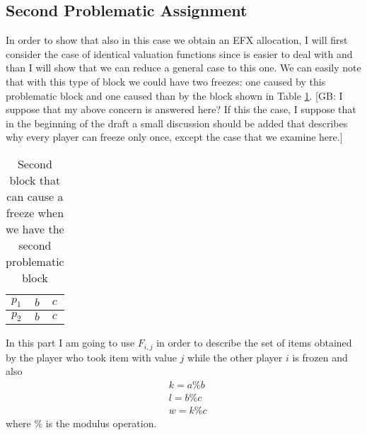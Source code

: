 \documentclass{article}
\newcommand{\gb}[1]{{\color{red}[GB: #1]}}
\begin{document}
\subsection{Second Problematic Assignment}
In order to show that also in this case we obtain an EFX allocation, I will first consider the case of identical valuation functions since is easier to deal with and than I will show that we can reduce a general case to this one. We can easily note that with this type of block we could have two freezes: one caused by this problematic block and one caused than by the block shown in Table \ref{table:bbcc-block}.
\gb{I suppose that my above concern is answered here? If this the case, I suppose that in the beginning of the draft a small discussion should be added that describes why every player can freeze only once, except the case that we examine here.}
\begin{table}[h]
        \centering
        \begin{tabular}{|l|l|l|}
            \hline
            $p_1$ & $b$ & $c$ \\ \hline
            $p_2$ & $b$ & $c$ \\ \hline
        \end{tabular}
        
        \caption{Second block that can cause a freeze when we have the second problematic block}
        \label{table:bbcc-block}
    \end{table}
In this part I am going to use $F_{i,j}$ in order to describe the set of items obtained by the player who took item with value $j$ while the other player $i$ is frozen and also
\begin{align*}
    &k = a\% b\\
    &l = b \% c\\
    &w = k \% c
\end{align*}
where $\%$ is the modulus operation.
\end{document}
